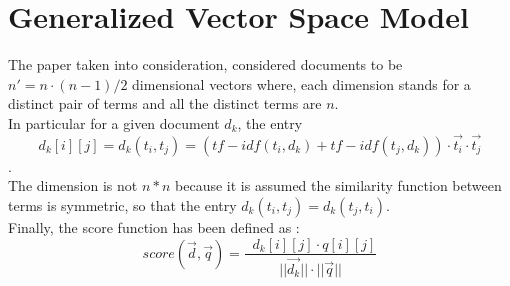 \documentclass[letterpaper, 10 pt, conference]{ieeeconf}  %
\begin{document}
\section{Generalized Vector Space Model}
The paper\cite{c1} taken into consideration, considered documents to be $n' = n\cdot(n-1)/2$ dimensional vectors where, each dimension stands for a distinct pair of terms and all the distinct terms are $n$.\\In particular for a given document $d_k$, the entry
\begin{equation}
    d_k[i][j] = d_k(t_i,t_j) = (tf-idf(t_i,d_k)+tf-idf(t_j,d_k)) \cdot \vec{t_i}\cdot\vec{t_j}
\end{equation}.\\The dimension is not $n*n$ because it is assumed the similarity function between terms is symmetric, so that the entry  $d_k(t_i,t_j) = d_k(t_j,t_i)$.\\Finally, the score function has been defined as :
\begin{equation}
    score(\vec{d},\vec{q}) = \frac{\mathop{\sum_{j=1}^{n'}\sum_{i=1}^{n'}}d_k[i][j]\cdot q[i][j] }{||\vec{d_k} ||\cdot||\vec{q} ||}
\end{equation}
\end{document}
